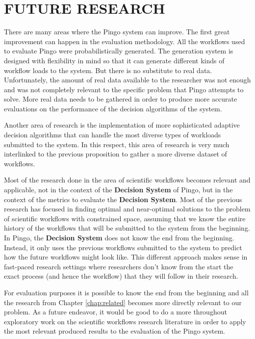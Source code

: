 \chapter{FUTURE RESEARCH}
\label{chap:future}
There are many areas where the Pingo system can improve.  The first great improvement can happen in the evaluation methodology. All the workflows used to evaluate Pingo were probabilistically generated.   The generation system is designed with flexibility in mind so that it can generate different kinds of workflow loads to the system.  But there is no substitute to real data. Unfortunately, the amount of real data available to the researcher was not enough and was not completely relevant to the specific problem that Pingo attempts to solve. More real data needs to be gathered in order to produce more accurate evaluations on the performance of the decision algorithms of the system.

Another area of research is the implementation of more sophisticated adaptive decision algorithms that can handle the most diverse types of workloads submitted to the system.  In this respect, this area of research is very much interlinked to the previous proposition to gather a more diverse dataset of workflows. 

Most of the research done in the area of scientific workflows becomes relevant and applicable, not in the context of the \textbf{Decision System} of Pingo, but in the context of the metrics to evaluate the \textbf{Decision System}.  Most of the previous research has focused in finding optimal and near-optimal solutions to the problem of scientific workflows with constrained space, assuming that we know the entire history of the workflows that will be submitted to the system from the beginning.  In Pingo, the \textbf{Decision System} does not know the end from the beginning.  Instead, it only uses the previous workflows submitted to the system to predict how the future workflows might look like.  This different approach makes sense in fast-paced research settings where researchers don't know from the start the exact process (and hence the workflow) that they will follow in their research.

For evaluation purposes it is possible to know the end from the beginning and all the research from Chapter \ref{chap:related} becomes more directly relevant to our problem.  As a future endeavor, it would be good to do a more throughout exploratory work on the scientific workflows research literature in order to apply the most relevant produced results to the evaluation of the Pingo system.

